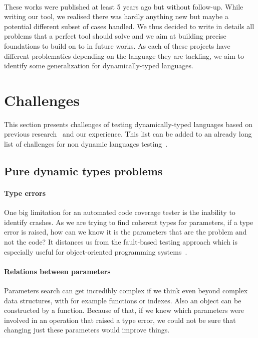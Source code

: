 \documentclass{llncs2e/llncs}
\begin{document}
\paragraph{} These works were published at least 5 years ago but without
follow-up. While writing our tool, we realised there was hardly anything new but
maybe a potential different subset of cases handled. We thus decided to write in
details all problems that a perfect tool should solve and we aim at building
precise foundations to build on to in future works. As each of these projects
have different problematics depending on the language they are tackling, we aim
to identify some generalization for dynamically-typed languages.%


\section{Challenges}
\label{challenges}

This section presents challenges of testing dynamically-typed languages based on
previous research~\cite{ducasse2011challenges} and our experience. This list
can be added to an already long list of challenges for non dynamic languages
testing~\cite{mcminn2011search}.

\subsection{Pure dynamic types problems}
\paragraph{Type errors} One big limitation for an automated code coverage tester
is the inability to identify crashes. As we are trying to find coherent types
for parameters, if a type error is raised, how can we know it is the parameters
that are the problem and not the code? It distances us from the fault-based
testing approach which is especially useful for object-oriented programming
systems~\cite{hayes1994testing}.

\paragraph{Relations between parameters} Parameters search can get incredibly
complex if we think even beyond complex data structures, with for example
functions or indexes. Also an object can be constructed by a function. Because
of that, if we knew which parameters were involved in an operation that raised a
type error, we could not be sure that changing just these parameters would
improve things.
\end{document}
